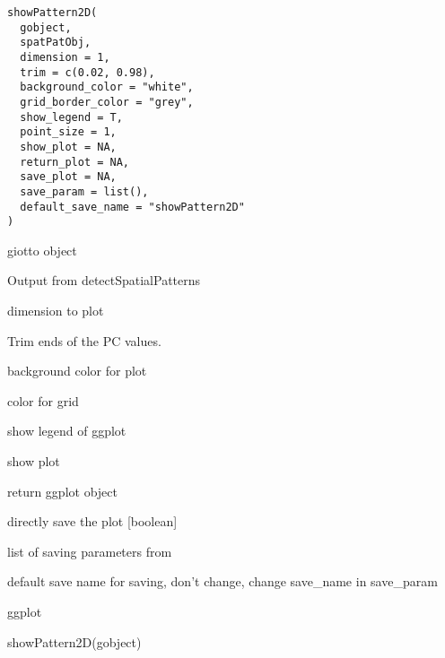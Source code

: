 \documentclass[a4paper]{book}
\begin{document}
%
\begin{Usage}
\begin{verbatim}
showPattern2D(
  gobject,
  spatPatObj,
  dimension = 1,
  trim = c(0.02, 0.98),
  background_color = "white",
  grid_border_color = "grey",
  show_legend = T,
  point_size = 1,
  show_plot = NA,
  return_plot = NA,
  save_plot = NA,
  save_param = list(),
  default_save_name = "showPattern2D"
)
\end{verbatim}
\end{Usage}
%
\begin{Arguments}
\begin{ldescription}
\item[\code{gobject}] giotto object

\item[\code{spatPatObj}] Output from detectSpatialPatterns

\item[\code{dimension}] dimension to plot

\item[\code{trim}] Trim ends of the PC values.

\item[\code{background\_color}] background color for plot

\item[\code{grid\_border\_color}] color for grid

\item[\code{show\_legend}] show legend of ggplot

\item[\code{show\_plot}] show plot

\item[\code{return\_plot}] return ggplot object

\item[\code{save\_plot}] directly save the plot [boolean]

\item[\code{save\_param}] list of saving parameters from 

\item[\code{default\_save\_name}] default save name for saving, don't change, change save\_name in save\_param
\end{ldescription}
\end{Arguments}
%
\begin{Value}
ggplot
\end{Value}
%
\begin{Examples}
\begin{ExampleCode}
    showPattern2D(gobject)
\end{ExampleCode}
\end{Examples}
\end{document}
